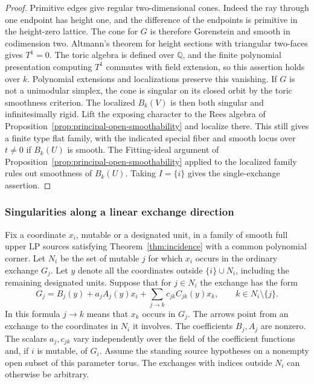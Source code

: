 \documentclass[11pt,reqno]{amsart}
\numberwithin{equation}{section}
\theoremstyle{definition}
\theoremstyle{remark}
\begin{document}
\begin{proof}
Primitive edges give regular two-dimensional cones. Indeed the
ray through one endpoint has height one, and the difference of the
endpoints is primitive in the height-zero lattice. The cone for
\(G\) is therefore Gorenstein and smooth in codimension two.
Altmann's theorem for height sections with triangular two-faces
\cite[Corollary~2.8(1)]{Altmann} gives \(T^1=0\).
The toric algebra is defined over \(\mathbb Q\), and the finite
polynomial presentation computing \(T^1\) commutes with field
extension, so this assertion holds over \(k\).
Polynomial extensions and localizations preserve this vanishing.
If \(G\) is not a unimodular simplex, the cone is singular on its
closed orbit by the toric smoothness criterion. The localized
\(B_k(V)\) is then both singular and infinitesimally rigid.
Lift the exposing character to the Rees algebra of
Proposition~\ref{prop:principal-open-smoothability} and localize there.
This still gives a finite type flat family, with the indicated
special fiber and smooth locus over \(t\ne0\) if \(B_k(U)\) is
smooth. The Fitting-ideal argument of
Proposition~\ref{prop:principal-open-smoothability} applied to the
localized family rules out smoothness of \(B_k(U)\). Taking \(I=\{i\}\)
gives the single-exchange assertion.
\end{proof}

\subsubsection{Singularities along a linear exchange direction}

Fix a coordinate \(x_i\), mutable or a designated unit, in a family
of smooth full upper LP sources satisfying Theorem~\ref{thm:incidence}
with a common polynomial corner. Let \(N_i\) be the set of mutable \(j\) for which \(x_i\)
occurs in the ordinary exchange \(G_j\). Let \(y\) denote all the coordinates outside \(\{i\}\cup N_i\), including the remaining designated units. Suppose that for \(j\in N_i\)
the exchange has the form
\[ G_j=B_j(y)+a_j A_j(y)x_i+ \sum_{j\to k}c_{jk} C_{jk}(y)x_k , \qquad k\in N_i\setminus\{j\}. \]
In this formula \(j\to k\) means that \(x_k\) occurs in \(G_j\).
The arrows point from an exchange to the coordinates in \(N_i\) it
involves. The coefficients \(B_j,A_j\) are nonzero.
The scalars \(a_j,c_{jk}\) vary independently over the field of
the coefficient functions and, if \(i\) is mutable, of \(G_i\). Assume the standing
source hypotheses on a nonempty open subset of this parameter
torus. The exchanges with indices outside \(N_i\) can otherwise be arbitrary.
\end{document}
